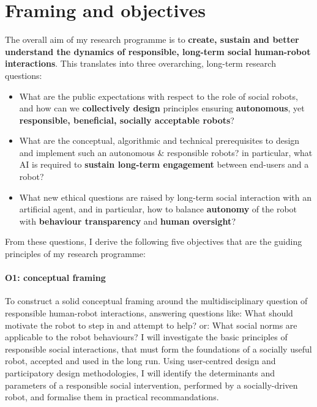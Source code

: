 \vspace{3em}
\section{Framing and objectives}

The overall aim of my research programme is to \textbf{create, sustain and better
understand the dynamics of responsible, long-term social human-robot
interactions}. This translates into three overarching, long-term research questions:

\vspace{0.5em}
\begin{itemize}
    \item What are the public expectations with respect to the role
        of social robots, and how can we \textbf{collectively design} principles ensuring
        \textbf{autonomous}, yet \textbf{responsible, beneficial, socially acceptable robots}?

    \item What are the conceptual, algorithmic and technical
        prerequisites to design and implement such an autonomous \& responsible
        robots? in particular, what
        AI is required to \textbf{sustain long-term engagement} between
        end-users and a robot?

    \item What new ethical questions are raised by long-term social
        interaction with an artificial agent, and in particular, how to balance
        \textbf{autonomy} of the robot with \textbf{behaviour transparency} and
        \textbf{human oversight}?
\end{itemize}

\vspace{0.5em}
\noindent From these questions, I derive the following five objectives that are
the guiding principles of my research programme:

\paragraph{\bf O1: conceptual framing} To construct a solid conceptual framing
around the multidisciplinary question of responsible human-robot interactions,
answering questions like: What should motivate the robot to step in
and attempt to help? or: What social norms are applicable to the robot behaviours? I
will investigate the basic principles of responsible social interactions, that
must form the foundations of a socially useful robot, accepted and used in the
long run.  Using user-centred design and participatory design methodologies, I
will identify the determinants and parameters of a responsible social
intervention, performed by a socially-driven robot, and formalise them in
practical recommandations.

